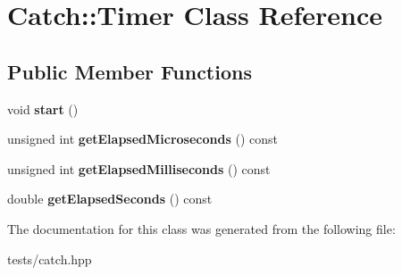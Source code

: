 \hypertarget{class_catch_1_1_timer}{}\section{Catch\+:\+:Timer Class Reference}
\label{class_catch_1_1_timer}
\subsection*{Public Member Functions}
\begin{DoxyCompactItemize}
\item 
\mbox{\label{class_catch_1_1_timer_a0a56e879e43f36c102bf9ea8b5fc8b72}} 
void {\bfseries start} ()
\item 
\mbox{\label{class_catch_1_1_timer_af592ca4a9d340b9855732e4af777eaf0}} 
unsigned int {\bfseries get\+Elapsed\+Microseconds} () const
\item 
\mbox{\label{class_catch_1_1_timer_a2081b2d36950ab6912e7c4958afe0099}} 
unsigned int {\bfseries get\+Elapsed\+Milliseconds} () const
\item 
\mbox{\label{class_catch_1_1_timer_ae1615c8a9aa44b7a96cfe8a35d34e5de}} 
double {\bfseries get\+Elapsed\+Seconds} () const
\end{DoxyCompactItemize}


The documentation for this class was generated from the following file\+:\begin{DoxyCompactItemize}
\item 
tests/catch.\+hpp\end{DoxyCompactItemize}

